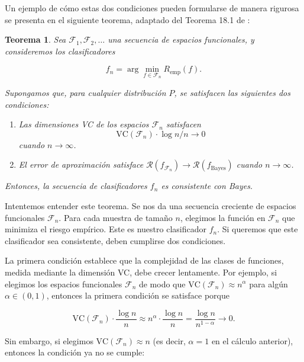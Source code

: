 \documentclass{report}
\newtheorem{thm}{Teorema}[section]
\begin{document}
Un ejemplo de cómo estas dos condiciones pueden formularse de manera rigurosa se presenta en el
siguiente teorema, adaptado del Teorema 18.1 de \cite{devroye1996}:

\begin{thm}
 Sea \(\mathcal{F}_1, \mathcal{F}_2, \dots\) una secuencia de espacios funcionales, y
consideremos los clasificadores

\[
f_n = \arg\min_{f \in \mathcal{F}_n} R_{\text{emp}}(f).
\]

Supongamos que, para cualquier distribución \(P\), se satisfacen las siguientes dos condiciones:

\begin{enumerate}
    \item Las dimensiones VC de los espacios \(\mathcal{F}_n\) satisfacen
    \[
    \text{VC}(\mathcal{F}_n) \cdot \log n / n \to 0
    \]
    cuando \(n \to \infty\).

    \item El error de aproximación satisface \(\mathcal{R}(f_{\mathcal{F}_n}) \to \mathcal{R}(f_{\text{Bayes}})\)
    cuando \(n \to \infty\).
\end{enumerate}

Entonces, la secuencia de clasificadores \(f_n\) es consistente con Bayes.

\end{thm}
\vspace{0.3cm}

Intentemos entender este teorema. Se nos da una secuencia creciente de espacios funcionales \(\mathcal{F}_n\).
Para cada muestra de tamaño \(n\), elegimos la función en \(\mathcal{F}_n\) que minimiza el riesgo empírico.
Este es nuestro clasificador \(f_n\). Si queremos que este clasificador sea consistente, deben cumplirse dos
condiciones.

La primera condición establece que la complejidad de las clases de funciones, medida mediante la dimensión VC,
debe crecer lentamente. Por ejemplo, si elegimos los espacios funcionales \(\mathcal{F}_n\) de modo que
\(\text{VC}(\mathcal{F}_n) \approx n^\alpha\) para algún \(\alpha \in (0,1)\), entonces la primera condición
se satisface porque

\[
\text{VC}(\mathcal{F}_n) \cdot \frac{\log n}{n} \approx n^\alpha \cdot \frac{\log n}{n} = \frac{\log n}{n^{1-\alpha}} \to 0.
\]

Sin embargo, si elegimos \(\text{VC}(\mathcal{F}_n) \approx n\) (es decir, \(\alpha = 1\) en el cálculo anterior),
entonces la condición ya no se cumple:
\end{document}
